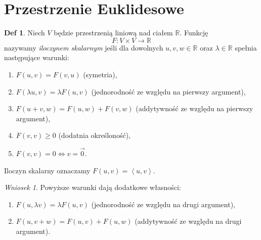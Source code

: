\documentclass[a4paper, 12pt]{mwart}
\theoremstyle{definition}
\newtheorem{definicja}{Def}[section]
\theoremstyle{plain}
\theoremstyle{remark}
\newtheorem{wniosek}{Wniosek}[section]
\begin{document}
\section{Przestrzenie Euklidesowe} %
\begin{definicja}
	Niech $V$ będzie przestrzenią liniową nad ciałem $\mathbb{R}$. Funkcję
	\begin{equation}
		F:V \times V \to \mathbb{R}
	\end{equation}
	nazywamy \emph{iloczynem skalarnym} jeśli dla dowolnych $u, v, w \in \mathbb{R}$ oraz $\lambda \in \mathbb{R}$ spełnia następujące warunki:
	\begin{enumerate}
		\item $F(u, v) = F(v, u)$ \quad (symetria),
		\item $F(\lambda u, v) = \lambda F(u, v)$ \quad (jednorodność ze względu na pierwszy argument),
		\item $F(u + v, w) = F(u, w) + F(v, w)$ \quad (addytywność ze względu na pierwszy argument),
		\item $F(v, v) \geq 0$ \quad (dodatnia określoność),
		\item $F(v, v) = 0 \iff v = \vec 0$.
		\setcounter{warunkiIloczynuSkalarnego}{\value{enumi}}
	\end{enumerate}
	Iloczyn skalarny oznaczamy $F(u, v) = \left<u, v\right>$.
\end{definicja}
\begin{wniosek}
	Powyższe warunki dają dodatkowe własności:
	\begin{enumerate}
		\setcounter{enumi}{\value{warunkiIloczynuSkalarnego}}
		\item $F(u, \lambda v) = \lambda F(u, v)$ \quad (jednorodność ze względu na drugi argument),
		\item $F(u, v + w) = F(u, v) + F(u, w)$ \quad (addytywność ze względu na drugi argument).
	\end{enumerate}
\end{wniosek}
\end{document}

